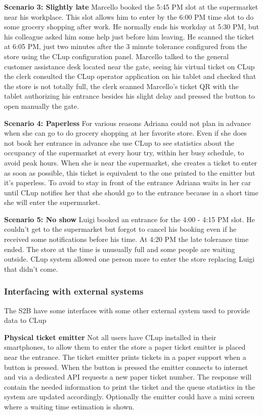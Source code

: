 \textbf{Scenario 3: Slightly late}
Marcello booked the 5:45 PM slot at the supermarket near his workplace. This slot allows him to enter by the 6:00 PM time slot to do some grocery shopping after work. He normally ends his workday at 5:30 PM, but his colleague asked him some help just before him leaving. He scanned the ticket at 6:05 PM, just two minutes after the 3 minute tolerance configured from the store using the CLup configuration panel. Marcello talked to the general customer assistance desk located near the gate, seeing his virtual ticket on CLup the clerk consulted the CLup operator application on his tablet and checked that the store is not totally full, the clerk scanned Marcello's ticket QR with the tablet authorizing his entrance besides his slight delay and pressed the button to open manually the gate.

\textbf{Scenario 4: Paperless}
For various reasons Adriana could not plan in advance when she can go to do grocery shopping at her favorite store. Even if she does not book her entrance in advance she use CLup to see statistics about the occupancy of the supermarket at every hour try, within her busy schedule, to avoid peak hours. When she is near the supermarket, she creates a ticket to enter as soon as possible, this ticket is equivalent to the one printed to the emitter but it's paperless. To avoid to stay in front of the entrance Adriana waits in her car until CLup notifies her that she should go to the entrance because in a short time she will enter the supermarket.

\textbf{Scenario 5: No show}
Luigi booked an entrance for the 4:00 - 4:15 PM slot. He couldn't get to the supermarket but forgot to cancel his booking even if he received some notifications before his time. At 4:20 PM the late tolerance time ended. The store at the time is unusually full and some people are waiting outside. CLup system allowed one person more to enter the store replacing Luigi that didn't come.


\subsubsection{Interfacing with external systems}
The S2B have some interfaces with some other external system used to provide data to CLup 



\textbf{Physical ticket emitter} Not all users have CLup installed in their smartphones, to allow them to enter the store a paper ticket emitter is
placed near the entrance. The ticket emitter prints tickets in 
a paper support when a button is pressed. When the button is pressed the emitter connects to internet and via a dedicated API requests a new paper ticket number. The response will contain the needed information to print the ticket and the queue statistics in the system are updated accordingly. Optionally the emitter could have a mini screen where a waiting time estimation is shown.



